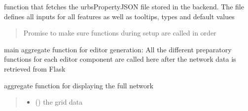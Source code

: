 \documentclass[letterpaper,10pt,english]{sphinxmanual}
\begin{document}
\begin{fulllineitems}
\label{\detokenize{docs_gui/js_api/urbs_editor/generate_urbs_setup_editor:GetUrbsSetupProperties}}
\pysigstartsignatures
{}
\pysigstopsignatures
\sphinxAtStartPar
function that fetches the urbsPropertyJSON file stored in the backend. The file defines all inputs for all features as well as tooltips, types and default values
\begin{quote}\begin{description}
\sphinxAtStartPar
Promise to make sure functions during setup are called in order

\end{description}\end{quote}

\end{fulllineitems}


\begin{fulllineitems}
\label{\detokenize{docs_gui/js_api/urbs_editor/generate_urbs_setup_editor:SetupUrbsEditor}}
\pysigstartsignatures
{}
\pysigstopsignatures
\sphinxAtStartPar
main aggregate function for editor generation: All the different preparatory functions for each editor component are called here
after the network data is retrieved from Flask

\end{fulllineitems}


\begin{fulllineitems}
\label{\detokenize{docs_gui/js_api/urbs_editor/generate_urbs_setup_editor:displayUrbsEditorNet}}
\pysigstartsignatures
{}
\pysigstopsignatures
\sphinxAtStartPar
aggregate function for displaying the full network
\begin{quote}\begin{description}
\begin{itemize}
\item {} 
\sphinxAtStartPar
{} () \textendash{} the grid data

\end{itemize}

\end{description}\end{quote}

\end{fulllineitems}
\end{document}

